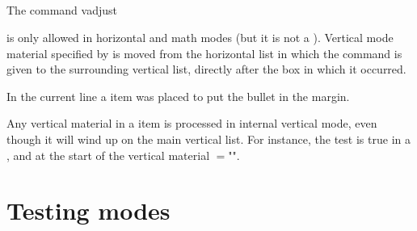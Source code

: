 \documentclass[twoside,letterpaper,openright]{rapport3}
\begin{document}
\subsection{}

The command
\cstoidx vadjust\par
\begin{disp}\lb{}\rb\end{disp}
is only allowed in horizontal and math modes (but it is
not a ).
Vertical mode material specified by  is moved from
the horizontal list in which the command is given
to the surrounding vertical list, directly after the box
in which it occurred.

In the current line
a  item was placed to put the bullet in the margin.


Any vertical material in a  item is processed
in internal vertical mode, even though it will wind up
on the main vertical list. For instance, the 
test is true in a , and at the start
\mdqon
of the vertical material $=$""\n{-1000pt}.
\mdqoff

\section{Testing modes}
\end{document}
